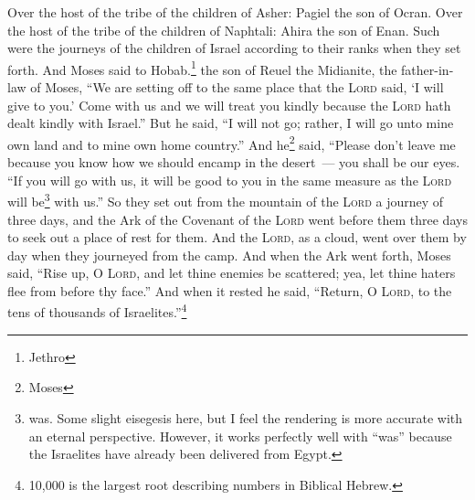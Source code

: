 \begin{enumerate}[align=center]
     Over the host of the tribe of the children of Asher: Pagiel the son of Ocran.%
     Over the host of the tribe of the children of Naphtali: Ahira the son of Enan.%
     Such were the journeys of the children of Israel according to their ranks when they set forth.%
     And Moses said to Hobab.\footnote{Jethro} the son of Reuel the Midianite, the father-in-law of Moses, ``We are setting off to the same place that the \textsc{Lord} said, `I will give to you.' Come with us and we will treat you kindly because the \textsc{Lord} hath dealt kindly with Israel.''%
     But he said, ``I will not go; rather, I will go unto mine own land and to mine own home country.''%
     And he\footnote{Moses} said, ``Please don't leave me because you know how we should encamp in the desert~--- you shall be our eyes.%
     ``If you will go with us, it will be good to you in the same measure as the \textsc{Lord} will be\footnote{was. Some slight eisegesis here, but I feel the rendering is more accurate with an eternal perspective. However, it works perfectly well with ``was'' because the Israelites have already been delivered from Egypt.} with us.''%
     So they set out from the mountain of the \textsc{Lord} a journey of three days, and the Ark of the Covenant of the \textsc{Lord} went before them three days to seek out a place of rest for them.%
     And the \textsc{Lord}, as a cloud, went over them by day when they journeyed from the camp.%
     And when the Ark went forth, Moses said, ``Rise up, O \textsc{Lord}, and let thine enemies be scattered; yea, let thine haters flee from before thy face.''%
     And when it rested he said, ``Return, O \textsc{Lord}, to the tens of thousands of Israelites.''\footnote{10,000 is the largest root describing numbers in Biblical Hebrew.}%
\end{enumerate}
